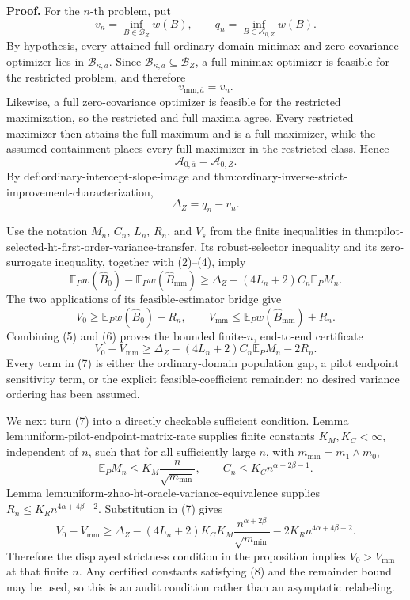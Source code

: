 \textbf{Proof.}
For the \(n\)-th problem, put
\[
 v_n=\inf_{B\in\mathcal B_Z}w(B),
 \qquad
 q_n=\inf_{B\in\mathcal A_{0,Z}}w(B).
 \tag{1}
\]
By hypothesis, every attained full ordinary-domain minimax and zero-covariance optimizer lies in \(\mathcal B_{\kappa,\overline a}\).  Since \(\mathcal B_{\kappa,\overline a}\subseteq\mathcal B_Z\), a full minimax optimizer is feasible for the restricted problem, and therefore
\[
 v_{\mathrm{mm},\overline a}=v_n.
 \tag{2}
\]
Likewise, a full zero-covariance optimizer is feasible for the restricted maximization, so the restricted and full maxima agree.  Every restricted maximizer then attains the full maximum and is a full maximizer, while the assumed containment places every full maximizer in the restricted class.  Hence
\[
 \mathcal A_{0,\overline a}=\mathcal A_{0,Z}.
 \tag{3}
\]
By def:ordinary-intercept-slope-image and thm:ordinary-inverse-strict-improvement-characterization,
\[
 \Delta_Z=q_n-v_n.
 \tag{4}
\]

Use the notation \(M_n\), \(C_n\), \(L_n\), \(R_n\), and \(V_s\) from the finite inequalities in thm:pilot-selected-ht-first-order-variance-transfer.  Its robust-selector inequality and its zero-surrogate inequality, together with (2)--(4), imply
\[
 \mathbb E_Pw(\widehat B_0)-\mathbb E_Pw(\widehat B_{\mathrm{mm}})
 \geq
 \Delta_Z-(4L_n+2)C_n\mathbb E_PM_n.
 \tag{5}
\]
The two applications of its feasible-estimator bridge give
\[
 V_0\geq\mathbb E_Pw(\widehat B_0)-R_n,
 \qquad
 V_{\mathrm{mm}}\leq\mathbb E_Pw(\widehat B_{\mathrm{mm}})+R_n.
 \tag{6}
\]
Combining (5) and (6) proves the bounded finite-\(n\), end-to-end certificate
\[
 \boxed{
 V_0-V_{\mathrm{mm}}
 \geq
 \Delta_Z-(4L_n+2)C_n\mathbb E_PM_n-2R_n.}
 \tag{7}
\]
Every term in (7) is either the ordinary-domain population gap, a pilot endpoint sensitivity term, or the explicit feasible-coefficient remainder; no desired variance ordering has been assumed.

We next turn (7) into a directly checkable sufficient condition.  Lemma lem:uniform-pilot-endpoint-matrix-rate supplies finite constants \(K_M,K_C<\infty\), independent of \(n\), such that for all sufficiently large \(n\), with \(m_{\min}=m_1\wedge m_0\),
\[
 \mathbb E_PM_n\leq K_M\frac{n}{\sqrt{m_{\min}}},
 \qquad
 C_n\leq K_Cn^{\alpha+2\beta-1}.
 \tag{8}
\]
Lemma lem:uniform-zhao-ht-oracle-variance-equivalence supplies \(R_n\leq K_Rn^{4\alpha+4\beta-2}\).  Substitution in (7) gives
\[
V_0-V_{\mathrm{mm}}
\ge
\Delta_Z
-(4L_n+2)K_CK_M\frac{n^{\alpha+2\beta}}{\sqrt{m_{\min}}}
-2K_Rn^{4\alpha+4\beta-2}.
\tag{9}
\]
Therefore the displayed strictness condition in the proposition implies \(V_0>V_{\mathrm{mm}}\) at that finite \(n\).  Any certified constants satisfying (8) and the remainder bound may be used, so this is an audit condition rather than an asymptotic relabeling.

